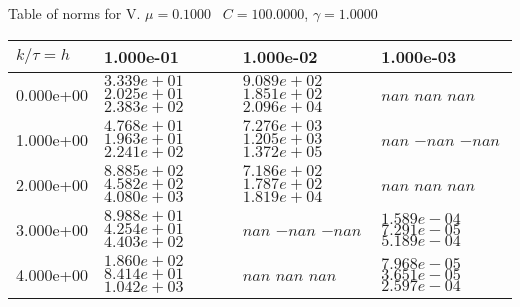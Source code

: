 \begin{center}
Table of norms for V. $\mu = 0.1000$ \, $C = 100.0000$, $\gamma = 1.0000$
  
\begin{tabular}{|p{1in}|p{1in}|p{1in}|p{1in}|} \hline
$k / \tau = h$ &1.000e-01 &1.000e-02 &1.000e-03 \\ \hline 
0.000e+00 & $3.339e+01$  $2.025e+01$  $2.383e+02$  & $9.089e+02$  $1.851e+02$  $2.096e+04$  & $nan$  $nan$  $nan$  \\ \hline 
1.000e+00 & $4.768e+01$  $1.963e+01$  $2.241e+02$  & $7.276e+03$  $1.205e+03$  $1.372e+05$  & $nan$  $-nan$  $-nan$  \\ \hline 
2.000e+00 & $8.885e+02$  $4.582e+02$  $4.080e+03$  & $7.186e+02$  $1.787e+02$  $1.819e+04$  & $nan$  $nan$  $nan$  \\ \hline 
3.000e+00 & $8.988e+01$  $4.254e+01$  $4.403e+02$  & $nan$  $-nan$  $-nan$  & $1.589e-04$  $7.291e-05$  $5.189e-04$  \\ \hline 
4.000e+00 & $1.860e+02$  $8.414e+01$  $1.042e+03$  & $nan$  $nan$  $nan$  & $7.968e-05$  $3.651e-05$  $2.597e-04$  \\ \hline 

\end{tabular}\\[20pt]
\end{center}
